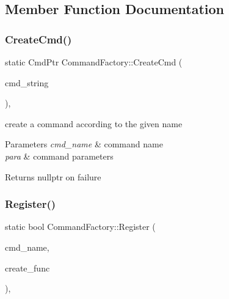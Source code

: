 \subsection{Member Function Documentation}
\mbox{\label{classCommandFactory_aec56c7b106ab048346e8d3119de83c57}} 
\subsubsection{\texorpdfstring{Create\+Cmd()}{CreateCmd()}}
{\footnotesize\ttfamily static Cmd\+Ptr Command\+Factory\+::\+Create\+Cmd (\begin{DoxyParamCaption}\item[{const string \&}]{cmd\+\_\+string }\end{DoxyParamCaption})\hspace{0.3cm}{\ttfamily [inline]}, {\ttfamily [static]}}



create a command according to the given {\ttfamily name} 


\begin{DoxyParams}{Parameters}
{\em cmd\+\_\+name} & command name \\
\hline
{\em para} & command parameters\\
\hline
\end{DoxyParams}
\begin{DoxyReturn}{Returns}
nullptr on failure 
\end{DoxyReturn}
\mbox{\label{classCommandFactory_a0a17b908385bd5087bd1cb45ae6b0639}} 
\subsubsection{\texorpdfstring{Register()}{Register()}}
{\footnotesize\ttfamily static bool Command\+Factory\+::\+Register (\begin{DoxyParamCaption}\item[{const string \&}]{cmd\+\_\+name,  }\item[{Create\+Function \&\&}]{create\+\_\+func }\end{DoxyParamCaption})\hspace{0.3cm}{\ttfamily [inline]}, {\ttfamily [static]}}




